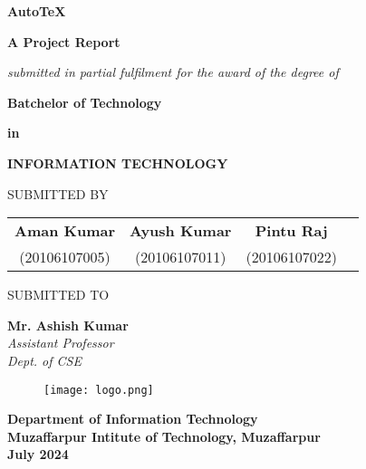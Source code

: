 \documentclass[12pt, a4paper]{article}
\begin{document}
\newenvironment{groupcenter}
{
    \begin{center}
    \setstretch{1.1}
}
{
    \end{center}
}


\begin{titlepage}
    \onehalfspacing
    \setlength{\parskip}{1.7em plus .5em minus .5em}
    \centering
    \textbf{\huge AutoTeX}\par
    \textbf{A Project Report}\par
    \textit{submitted in partial fulfilment for the award of the degree of}\par
    \textbf{Batchelor of Technology}\par
    \textbf{in}\par
    \textbf{INFORMATION TECHNOLOGY}\par
    SUBMITTED BY\par
    
    \begin{table}[H]
        \centering
        \doublespacing
        \setlength{\tabcolsep}{12pt}
        \renewcommand{\arraystretch}{0.75}
        \begin{tabular}{cccc}
            
            \textbf{Aman Kumar} &  \textbf{Ayush Kumar} & \textbf{Pintu Raj} \\
            (20106107005) & (20106107011) & (20106107022) 
        \end{tabular}
    \end{table}

    SUBMITTED TO\par
    \begin{groupcenter}
    \textbf{Mr. Ashish Kumar}\\
    \textit{Assistant Professor}\\
    \textit{Dept. of CSE}\\
    \end{groupcenter}
    
    \vspace{1cm plus 0.5cm}
    \begin{figure}[H]
        \centering
        \texttt{[image: logo.png]}
    \end{figure}
    \vspace{1cm plus 0.5cm}
    
    \begin{groupcenter}
    \bfseries
    Department of Information Technology\\
    Muzaffarpur Intitute of Technology, Muzaffarpur\\
    July 2024
    \end{groupcenter}
    
\end{titlepage}
\end{document}
